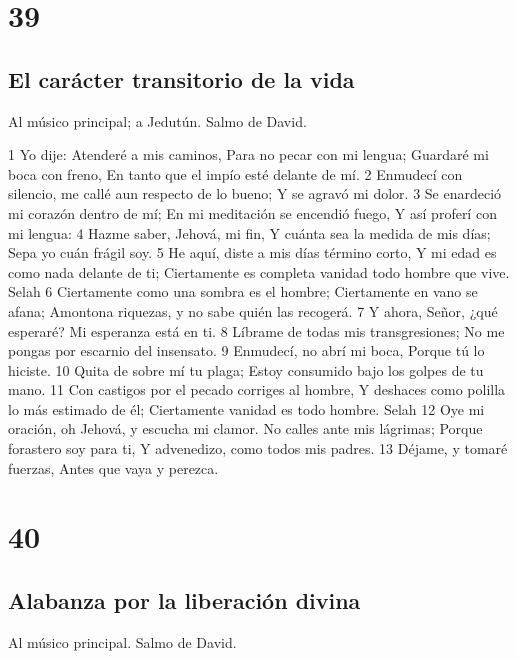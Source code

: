 \chapter{39}

\section*{El carácter transitorio de la vida}

Al músico principal; a Jedutún. Salmo de David.

1 Yo dije: Atenderé a mis caminos,
Para no pecar con mi lengua;
Guardaré mi boca con freno,
En tanto que el impío esté delante de mí.
2 Enmudecí con silencio, me callé aun respecto de lo bueno;
Y se agravó mi dolor.
3 Se enardeció mi corazón dentro de mí;
En mi meditación se encendió fuego,
Y así proferí con mi lengua:
4 Hazme saber, Jehová, mi fin,
Y cuánta sea la medida de mis días;
Sepa yo cuán frágil soy.
5 He aquí, diste a mis días término corto,
Y mi edad es como nada delante de ti;
Ciertamente es completa vanidad todo hombre que vive. Selah
6 Ciertamente como una sombra es el hombre;
Ciertamente en vano se afana;
Amontona riquezas, y no sabe quién las recogerá.
7 Y ahora, Señor, ¿qué esperaré?
Mi esperanza está en ti.
8 Líbrame de todas mis transgresiones;
No me pongas por escarnio del insensato.
9 Enmudecí, no abrí mi boca,
Porque tú lo hiciste.
10 Quita de sobre mí tu plaga;
Estoy consumido bajo los golpes de tu mano.
11 Con castigos por el pecado corriges al hombre,
Y deshaces como polilla lo más estimado de él;
Ciertamente vanidad es todo hombre. Selah
12 Oye mi oración, oh Jehová, y escucha mi clamor.
No calles ante mis lágrimas;
Porque forastero soy para ti,
Y advenedizo, como todos mis padres.
13 Déjame, y tomaré fuerzas,
Antes que vaya y perezca.

\chapter{40}

\section*{Alabanza por la liberación divina}

Al músico principal. Salmo de David.

